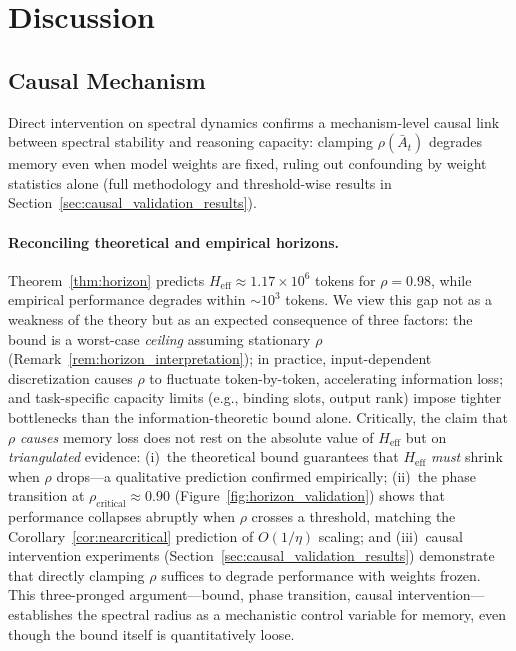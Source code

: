 \documentclass[10pt,twocolumn]{article}
\begin{document}
\section{Discussion}
\label{sec:discussion}

\subsection{Causal Mechanism}
\label{sec:causal_mechanism}

Direct intervention on spectral dynamics confirms a mechanism-level causal link between spectral stability and reasoning capacity: clamping $\rho(\bar{A}_t)$ degrades memory even when model weights are fixed, ruling out confounding by weight statistics alone (full methodology and threshold-wise results in Section~\ref{sec:causal_validation_results}).

\paragraph{Reconciling theoretical and empirical horizons.}
Theorem~\ref{thm:horizon} predicts $H_{\text{eff}} \approx 1.17 \times 10^6$ tokens for $\rho = 0.98$, while empirical performance degrades within $\sim$$10^3$ tokens. We view this gap not as a weakness of the theory but as an expected consequence of three factors: the bound is a worst-case \emph{ceiling} assuming stationary $\rho$ (Remark~\ref{rem:horizon_interpretation}); in practice, input-dependent discretization causes $\rho$ to fluctuate token-by-token, accelerating information loss; and task-specific capacity limits (e.g., binding slots, output rank) impose tighter bottlenecks than the information-theoretic bound alone. Critically, the claim that $\rho$ \emph{causes} memory loss does not rest on the absolute value of $H_{\text{eff}}$ but on \emph{triangulated} evidence: (i)~the theoretical bound guarantees that $H_{\text{eff}}$ \emph{must} shrink when $\rho$ drops---a qualitative prediction confirmed empirically; (ii)~the phase transition at $\rho_{\text{critical}} \approx 0.90$ (Figure~\ref{fig:horizon_validation}) shows that performance collapses abruptly when $\rho$ crosses a threshold, matching the Corollary~\ref{cor:nearcritical} prediction of $O(1/\eta)$ scaling; and (iii)~causal intervention experiments (Section~\ref{sec:causal_validation_results}) demonstrate that directly clamping $\rho$ suffices to degrade performance with weights frozen. This three-pronged argument---bound, phase transition, causal intervention---establishes the spectral radius as a mechanistic control variable for memory, even though the bound itself is quantitatively loose.
\end{document}
